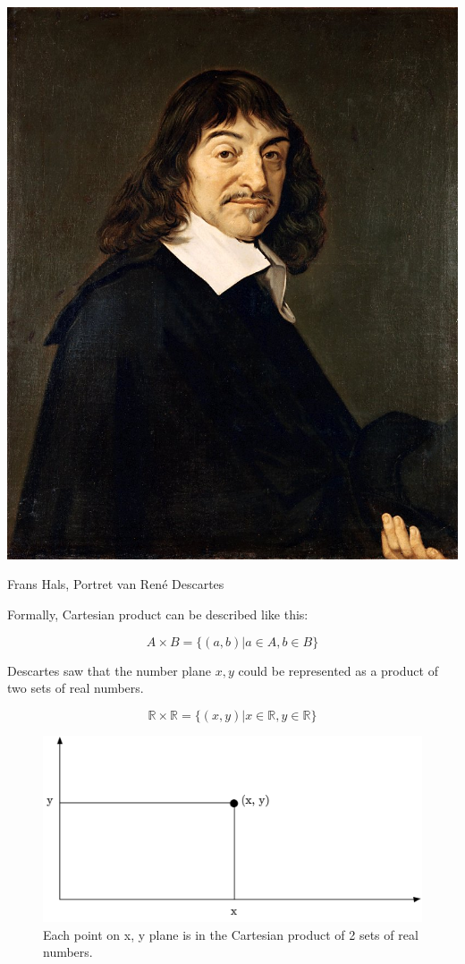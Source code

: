 \documentclass[12pt, a4paper, justified, notitlepage, sfsidenotes, notoc]{book}
\begin{document}
\begin{marginfigure}
  \includegraphics[width=\linewidth]{images/Frans_Hals_-_Portret_van_Rene_Descartes.jpg}
  \caption{Frans Hals, Portret van René Descartes}
  \label{fig:marginfig}
\end{marginfigure}

Formally, Cartesian product can be described like this:

\begin{equation}
A \times B = \{(a,b) | a \in A, b \in B\}
\end{equation}

Descartes saw that the number plane \(x, y\) could be represented as a product of two sets of real numbers.

\begin{equation}
\mathbb{R} \times \mathbb{R} = \{(x, y) | x \in \mathbb{R}, y \in \mathbb{R}\}
\end{equation}

\begin{figure}[htbp]
\centering
\includegraphics[width=.9\linewidth]{./images/xy_plane.png}
\caption{\label{fig:orge2eb83a}
Each point on x, y plane is in the Cartesian product of 2 sets of real numbers.}
\end{figure}
\end{document}
